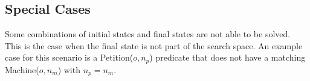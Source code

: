 \subsection{Special Cases}
\label{sub:sc}

Some combinations of initial states and final states are not able to be solved. This is the case when the final state is not part of the search space. An example case for this scenario is a Petition($o,n_p$) predicate that does not have a matching Machine($o, n_m$) with $n_p=n_m$. 




